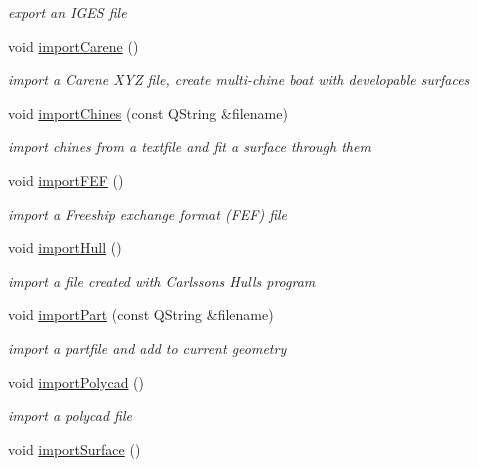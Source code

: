 \begin{DoxyCompactItemize}
\begin{DoxyCompactList}\small\item\em export an I\+G\+ES file \end{DoxyCompactList}\item 
void \hyperlink{classShipCAD_1_1Controller_aef735cfaf32fe83bf1091f9323e7061b}{import\+Carene} ()
\begin{DoxyCompactList}\small\item\em import a Carene X\+YZ file, create multi-\/chine boat with developable surfaces \end{DoxyCompactList}\item 
void \hyperlink{classShipCAD_1_1Controller_a1eb61158ebc1814530f6b93d1ddf8d14}{import\+Chines} (const Q\+String \&filename)
\begin{DoxyCompactList}\small\item\em import chines from a textfile and fit a surface through them \end{DoxyCompactList}\item 
void \hyperlink{classShipCAD_1_1Controller_a1e36fc51758f120731b0ff79855fab05}{import\+F\+EF} ()
\begin{DoxyCompactList}\small\item\em import a Freeship exchange format (F\+EF) file \end{DoxyCompactList}\item 
void \hyperlink{classShipCAD_1_1Controller_a0ce9a5b0d89230deea8a85cd32ec24da}{import\+Hull} ()
\begin{DoxyCompactList}\small\item\em import a file created with Carlsson\textquotesingle{}s Hulls program \end{DoxyCompactList}\item 
void \hyperlink{classShipCAD_1_1Controller_ab341d0cdcbff45647e52544eed79b4f5}{import\+Part} (const Q\+String \&filename)
\begin{DoxyCompactList}\small\item\em import a partfile and add to current geometry \end{DoxyCompactList}\item 
void \hyperlink{classShipCAD_1_1Controller_a7ec129046c11bd2be6cc388ca85206ce}{import\+Polycad} ()
\begin{DoxyCompactList}\small\item\em import a polycad file \end{DoxyCompactList}\item 
void \hyperlink{classShipCAD_1_1Controller_a229916f691507a3fa9393d0f9fbc1de5}{import\+Surface} ()

\end{DoxyCompactItemize}
